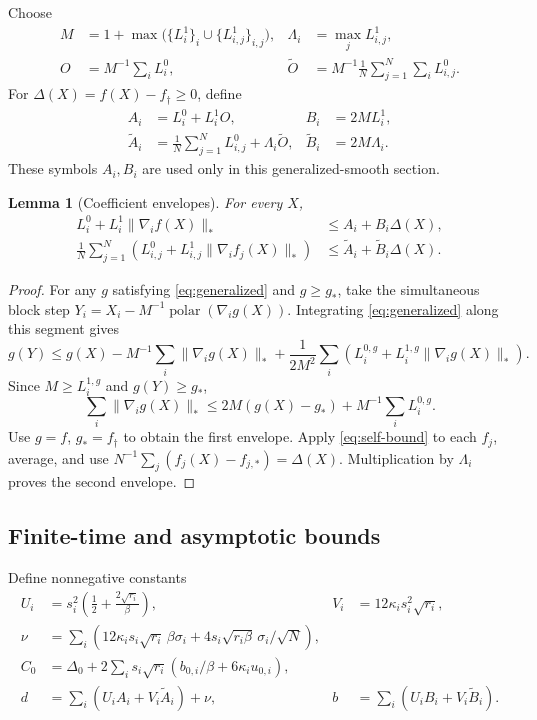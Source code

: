 \documentclass[11pt]{article}
\newtheorem{lemma}{Lemma}
\newcommand{\nuc}[1]{\lVert #1\rVert_*}
\newcommand{\avg}{\frac1N\sum_{j=1}^N}
\newcommand{\pol}{\operatorname{polar}}
\begin{document}
Choose
\begin{align}
 M&=1+\max\bigl(\{L_i^1\}_i\cup\{L_{i,j}^1\}_{i,j}\bigr),
 &\Lambda_i&=\max_jL_{i,j}^1,\\
 O&=M^{-1}\sum_iL_i^0,
 &\widetilde O&=M^{-1}\avg\sum_i L_{i,j}^0.
\end{align}
For $\Delta(X)=f(X)-f_\dagger\ge0$, define
\begin{align}
 A_i&=L_i^0+L_i^1O,&B_i&=2ML_i^1,\label{eq:gen-AB}\\
 \widetilde A_i&=\avg L_{i,j}^0+\Lambda_i\widetilde O,
 &\widetilde B_i&=2M\Lambda_i.
\end{align}
These symbols $A_i,B_i$ are used only in this generalized-smooth section.

\begin{lemma}[Coefficient envelopes]\label{lem:envelope}
For every $X$,
\begin{align}
 L_i^0+L_i^1\nuc{\nabla_i f(X)}&\le A_i+B_i\Delta(X),\label{eq:gen-global-env}\\
 \avg\left(L_{i,j}^0+L_{i,j}^1\nuc{\nabla_i f_j(X)}\right)
 &\le\widetilde A_i+\widetilde B_i\Delta(X).
 \label{eq:gen-local-env}
\end{align}
\end{lemma}
\begin{proof}
For any $g$ satisfying \eqref{eq:generalized} and $g\ge g_*$, take the
simultaneous block step $Y_i=X_i-M^{-1}\pol(\nabla_i g(X))$.
Integrating \eqref{eq:generalized} along this segment gives
\[
 g(Y)\le g(X)-M^{-1}\sum_i\nuc{\nabla_i g(X)}
       +\frac1{2M^2}\sum_i
          \left(L_i^{0,g}+L_i^{1,g}\nuc{\nabla_i g(X)}\right).
\]
Since $M\ge L_i^{1,g}$ and $g(Y)\ge g_*$,
\begin{equation}\label{eq:self-bound}
 \sum_i\nuc{\nabla_i g(X)}
 \le2M(g(X)-g_*)+M^{-1}\sum_iL_i^{0,g}.
\end{equation}
Use $g=f$, $g_*=f_\dagger$ to obtain the first envelope. Apply
\eqref{eq:self-bound} to each $f_j$, average, and use
$N^{-1}\sum_j(f_j(X)-f_{j,*})=\Delta(X)$. Multiplication by
$\Lambda_i$ proves the second envelope.
\end{proof}

\subsection{Finite-time and asymptotic bounds}

Define nonnegative constants
\begin{align}
 U_i&=s_i^2\left(\frac12+\frac{2\sqrt{r_i}}\beta\right),
 &V_i&=12\kappa_i s_i^2\sqrt{r_i},\\
 \nu&=\sum_i\left(12\kappa_i s_i\sqrt{r_i}\,\beta\sigma_i
          +4s_i\sqrt{r_i\beta}\,\sigma_i/\sqrt N\right),\\
 C_0&=\Delta_0+2\sum_i s_i\sqrt{r_i}
                      (b_{0,i}/\beta+6\kappa_i u_{0,i}),\\
 d&=\sum_i(U_iA_i+V_i\widetilde A_i)+\nu,
 &b&=\sum_i(U_iB_i+V_i\widetilde B_i).
 \label{eq:gen-constants}
\end{align}
\end{document}
